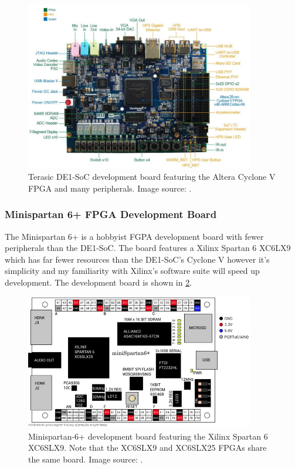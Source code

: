 \begin{figure}[h]
\centering 
\includegraphics[width=10cm]{../img/de1soc}
\caption{Terasic DE1-SoC development board featuring the Altera Cyclone V FPGA and many peripherals. Image source: \cite{de1soc}.}
\label{fig:de1soc}
\end{figure}

\subsubsection{Minispartan 6+ FPGA Development Board}
The Minispartan 6+ is a hobbyist FGPA development board with fewer peripherals than the DE1-SoC. The board features a Xilinx Spartan 6 XC6LX9 which has far fewer resources than the DE1-SoC's Cyclone V however it's simplicity and my familiarity with  Xilinx's software suite will speed up development. The development board is shown in \cref{fig:minispartan}.

\begin{figure}[h]
\centering 
\includegraphics[width=10cm]{../img/minispartan}
\caption{Minispartan-6+ development board featuring the Xilinx Spartan 6 XC6SLX9. Note that the XC6SLX9 and XC6SLX25 FPGAs share the same board. Image source: \cite{scarabhardware}.}
\label{fig:minispartan}
\end{figure}

